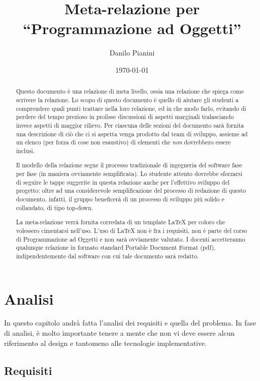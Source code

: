 \documentclass[a4paper,12pt]{report}
\title{Meta-relazione per ``Programmazione ad Oggetti''}
\author{Danilo Pianini}
\date{\today}
\begin{document}
 
\maketitle

\begin{abstract}
Questo documento è una relazione di meta livello, ossia una relazione che spiega come scrivere la relazione.
%
Lo scopo di questo documento è quello di aiutare gli studenti a comprendere quali punti trattare nella loro relazione, ed in che modo farlo, evitando di perdere del tempo prezioso in prolisse discussioni di aspetti marginali tralasciando invece aspetti di maggior rilievo.
%
Per ciascuna delle sezioni del documento sarà fornita una descrizione di ciò che ci si aspetta venga prodotto dal team di sviluppo, assieme ad un elenco (per forza di cose non esaustivo) di elementi che \emph{non} dovrebbero essere inclusi.

Il modello della relazione segue il processo tradizionale di ingegneria del software fase per fase (in maniera ovviamente semplificata).
%
Lo studente attento dovrebbe sforzarsi di seguire le tappe suggerite in questa relazione anche per l'effettivo sviluppo del progetto: oltre ad una considerevole semplificazione del processo di redazione di questo documento, infatti, il gruppo beneficerà di un processo di sviluppo più solido e collaudato, di tipo top-down.

La meta-relazione verrà fornita corredata di un template \LaTeX{} per coloro che volessero cimentarsi nell'uso.
%
L'uso di \LaTeX{} non è fra i requisiti, non è parte del corso di Programmazione ad Oggetti e non sarà ovviamente valutato. I docenti accetteranno qualunque relazione in formato standard Portable Document Format (pdf), indipendentemente dal software con cui tale documento sarà redatto.
\end{abstract}

\tableofcontents
 
\chapter{Analisi}

In questo capitolo andrà fatta l'analisi dei requisiti e quella del problema.
%
In fase di analisi, è molto importante tenere a mente che non vi deve essere alcun riferimento al design e tantomeno alle tecnologie implementative.

\section{Requisiti}
\end{document}
